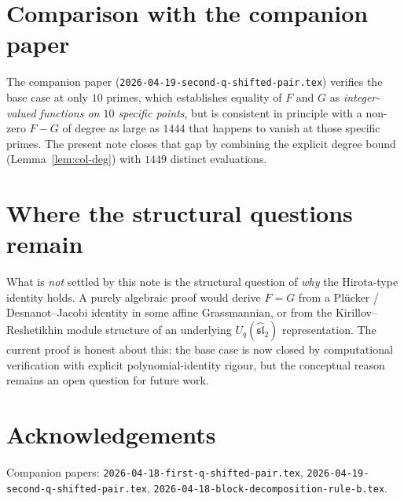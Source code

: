\documentclass[11pt]{article}
\theoremstyle{definition}
\begin{document}
\section{Comparison with the companion paper}

The companion paper (\texttt{2026-04-19-second-q-shifted-pair.tex}) verifies
the base case at only $10$ primes, which establishes equality of $F$ and $G$ as
\emph{integer-valued functions on $10$ specific points}, but is consistent in
principle with a non-zero $F-G$ of degree as large as $1444$ that happens to
vanish at those specific primes. The present note closes that gap by combining
the explicit degree bound (Lemma~\ref{lem:col-deg}) with $1449$ distinct
evaluations.

\section{Where the structural questions remain}

What is \emph{not} settled by this note is the structural question of \emph{why}
the Hirota-type identity holds. A purely algebraic proof would derive
$F=G$ from a Pl\"ucker / Desnanot--Jacobi identity in some affine Grassmannian,
or from the Kirillov--Reshetikhin module structure of an underlying
$U_q(\widehat{\mathfrak{sl}}_2)$ representation. The current proof is honest
about this: the base case is now closed by computational verification with
explicit polynomial-identity rigour, but the conceptual reason remains an open
question for future work.

\section*{Acknowledgements}

Companion papers:
\texttt{2026-04-18-first-q-shifted-pair.tex},
\texttt{2026-04-19-second-q-shifted-pair.tex},
\texttt{2026-04-18-block-decomposition-rule-b.tex}.
\end{document}
